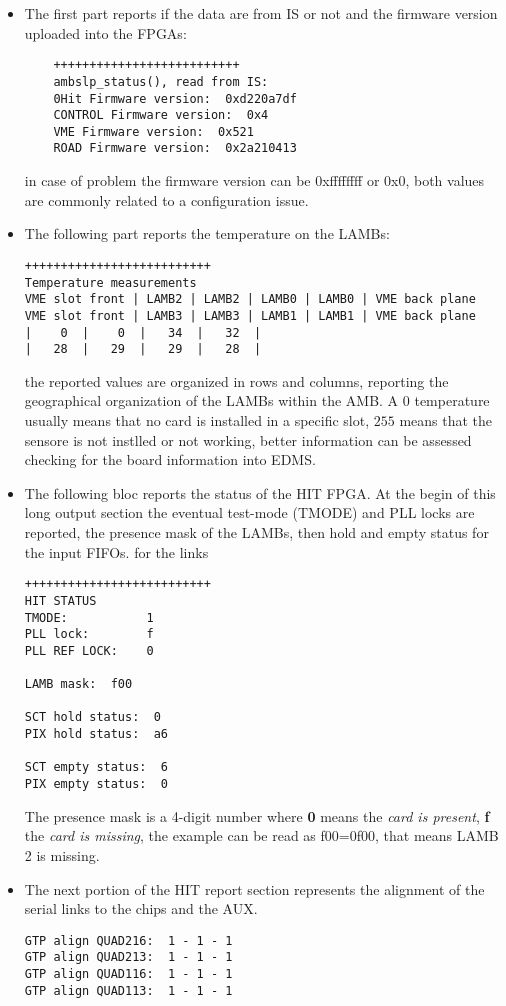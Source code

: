\documentclass[UKenglish]{latex/atlasdoc}
\begin{document}
\begin{itemize}
	\item The first part reports if the data are from IS or not and the
	firmware version uploaded into the FPGAs:
	\begin{verbatim}
	++++++++++++++++++++++++++
	ambslp_status(), read from IS:
	0Hit Firmware version:  0xd220a7df
	CONTROL Firmware version:  0x4
	VME Firmware version:  0x521
	ROAD Firmware version:  0x2a210413
	\end{verbatim}
	in case of problem  the firmware version  can be 0xffffffff or 0x0, 
	both values are commonly related to a configuration issue.
	
	\item The following part reports the temperature on the LAMBs:
\begin{verbatim}
++++++++++++++++++++++++++
Temperature measurements
VME slot front | LAMB2 | LAMB2 | LAMB0 | LAMB0 | VME back plane
VME slot front | LAMB3 | LAMB3 | LAMB1 | LAMB1 | VME back plane
|    0  |    0  |   34  |   32  |
|   28  |   29  |   29  |   28  |
\end{verbatim}		
	the reported values are organized in rows and columns, reporting
	the geographical organization of the LAMBs within the AMB. A $0$
	temperature usually means that no card is installed in a specific slot,
	$255$ means that the sensore is not instlled or not working,
	better information can be assessed checking for the board information
	into EDMS.

	\item The following bloc reports the status of the HIT FPGA. At the
	begin of this long output section the eventual test-mode (TMODE) and
	PLL locks are reported, the presence mask of the LAMBs, then hold and 
	empty status for the input FIFOs.
	for the links
\begin{verbatim}
++++++++++++++++++++++++++
HIT STATUS
TMODE:           1
PLL lock:        f
PLL REF LOCK:    0

LAMB mask:  f00

SCT hold status:  0
PIX hold status:  a6

SCT empty status:  6
PIX empty status:  0
\end{verbatim}
	The presence mask is a 4-digit number where \textbf{0} means the 
	\emph{card is present}, \textbf{f} the \emph{card is missing}, the
	example can be read as f00=0f00, that means LAMB 2 is missing.

	\item The next portion of the HIT report section represents the
	alignment of the serial links to the chips and the AUX.
\begin{verbatim}
GTP align QUAD216:  1 - 1 - 1
GTP align QUAD213:  1 - 1 - 1
GTP align QUAD116:  1 - 1 - 1
GTP align QUAD113:  1 - 1 - 1


\end{verbatim}
\end{itemize}
\end{document}
